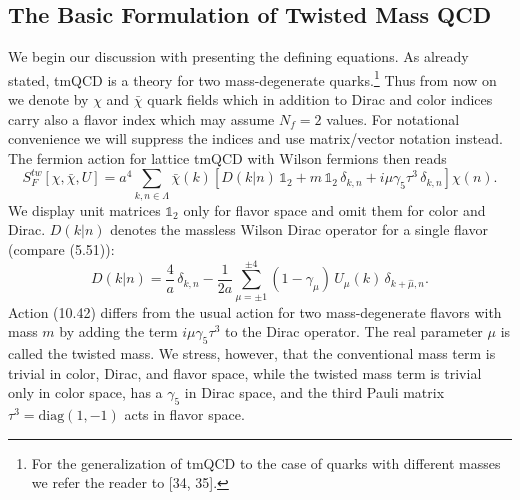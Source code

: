 \subsection{The Basic Formulation of Twisted Mass QCD}

We begin our discussion with presenting the defining equations. As already
stated, tmQCD is a theory for two mass-degenerate quarks.\footnote{For the
generalization of tmQCD to the case of quarks with different masses we refer
the reader to [34, 35].} Thus from now on we denote by $\chi$ and $\bar\chi$
quark fields which in addition to Dirac and color indices carry also a flavor
index which may assume $N_f = 2$ values. For notational convenience we will
suppress the indices and use matrix/vector notation instead. The fermion
action for lattice tmQCD with Wilson fermions then reads
\begin{equation}
  S_F^{tw}[\chi, \bar\chi, U] = a^4 \sum_{k,n\in\Lambda}
  \bar\chi(k)\left[D(k|n)\,\mathbb{1}_2 + m\,\mathbb{1}_2\,\delta_{k,n}
  + i\mu\gamma_5\tau^3\,\delta_{k,n}\right]\chi(n) .
\end{equation}
We display unit matrices $\mathbb{1}_2$ only for flavor space and omit them
for color and Dirac. $D(k|n)$ denotes the massless Wilson Dirac operator for a
single flavor (compare (5.51)):
\begin{equation}
  D(k|n) = \frac{4}{a}\,\delta_{k,n} -
  \frac{1}{2a}\sum_{\mu=\pm1}^{\pm4}
  (1 - \gamma_\mu)\, U_\mu(k)\, \delta_{k+\hat\mu,n} .
\end{equation}
Action (10.42) differs from the usual action for two mass-degenerate flavors
with mass $m$ by adding the term $i\mu\gamma_5\tau^3$ to the Dirac operator.
The real parameter $\mu$ is called the twisted mass. We stress, however, that
the conventional mass term is trivial in color, Dirac, and flavor space, while
the twisted mass term is trivial only in color space, has a $\gamma_5$ in
Dirac space, and the third Pauli matrix $\tau^3 = \mathrm{diag}(1,-1)$ acts in
flavor space.

